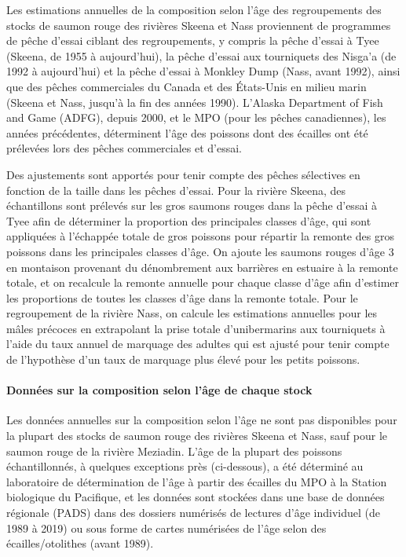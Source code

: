 \documentclass[french,11pt]{book}
\begin{document}
Les estimations annuelles de la composition selon l'âge des regroupements des stocks de saumon rouge des rivières Skeena et Nass proviennent de programmes de pêche d'essai ciblant des regroupements, y compris la pêche d'essai à Tyee (Skeena, de 1955 à aujourd'hui), la pêche d'essai aux tourniquets des Nisga'a (de 1992 à aujourd'hui) et la pêche d'essai à Monkley Dump (Nass, avant 1992), ainsi que des pêches commerciales du Canada et des États-Unis en milieu marin (Skeena et Nass, jusqu'à la fin des années 1990). L'Alaska Department of Fish and Game (ADFG), depuis 2000, et le MPO (pour les pêches canadiennes), les années précédentes, déterminent l'âge des poissons dont des écailles ont été prélevées lors des pêches commerciales et d'essai.

Des ajustements sont apportés pour tenir compte des pêches sélectives en fonction de la taille dans les pêches d'essai. Pour la rivière Skeena, des échantillons sont prélevés sur les gros saumons rouges dans la pêche d'essai à Tyee afin de déterminer la proportion des principales classes d'âge, qui sont appliquées à l'échappée totale de gros poissons pour répartir la remonte des gros poissons dans les principales classes d'âge. On ajoute les saumons rouges d'âge 3 en montaison provenant du dénombrement aux barrières en estuaire à la remonte totale, et on recalcule la remonte annuelle pour chaque classe d'âge afin d'estimer les proportions de toutes les classes d'âge dans la remonte totale. Pour le regroupement de la rivière Nass, on calcule les estimations annuelles pour les mâles précoces en extrapolant la prise totale d'unibermarins aux tourniquets à l'aide du taux annuel de marquage des adultes qui est ajusté pour tenir compte de l'hypothèse d'un taux de marquage plus élevé pour les petits poissons.

\paragraph{Données sur la composition selon l'âge de chaque stock}\label{donnuxe9es-sur-la-composition-selon-luxe2ge-de-chaque-stock}

Les données annuelles sur la composition selon l'âge ne sont pas disponibles pour la plupart des stocks de saumon rouge des rivières Skeena et Nass, sauf pour le saumon rouge de la rivière Meziadin. L'âge de la plupart des poissons échantillonnés, à quelques exceptions près (ci-dessous), a été déterminé au laboratoire de détermination de l'âge à partir des écailles du MPO à la Station biologique du Pacifique, et les données sont stockées dans une base de données régionale (PADS) dans des dossiers numérisés de lectures d'âge individuel (de 1989 à 2019) ou sous forme de cartes numérisées de l'âge selon des écailles/otolithes (avant 1989).
\end{document}
